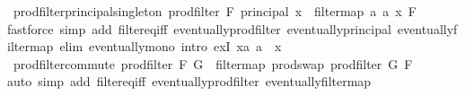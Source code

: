 \begin{isabellebody}
%
\isadelimproof
\isanewline
%
\endisadelimproof
\isanewline
{}\isamarkupfalse%
\ prod{\isacharunderscore}{\kern0pt}filter{\isacharunderscore}{\kern0pt}principal{\isacharunderscore}{\kern0pt}singleton{}{\isacharcolon}{\kern0pt}\ {\isachardoublequoteopen}prod{\isacharunderscore}{\kern0pt}filter\ F\ {\isacharparenleft}{\kern0pt}principal\ {\isacharbraceleft}{\kern0pt}x{\isacharbraceright}{\kern0pt}{\isacharparenright}{\kern0pt}\ {\isacharequal}{\kern0pt}\ filtermap\ {\isacharparenleft}{\kern0pt}{\isasymlambda}a{\isachardot}{\kern0pt}\ {\isacharparenleft}{\kern0pt}a{\isacharcomma}{\kern0pt}\ x{\isacharparenright}{\kern0pt}{\isacharparenright}{\kern0pt}\ F{\isachardoublequoteclose}\isanewline
%
\isadelimproof
\ \ %
\endisadelimproof
%
\isatagproof
{}\isamarkupfalse%
{\isacharparenleft}{\kern0pt}fastforce\ simp\ add{\isacharcolon}{\kern0pt}\ filter{\isacharunderscore}{\kern0pt}eq{\isacharunderscore}{\kern0pt}iff\ eventually{\isacharunderscore}{\kern0pt}prod{\isacharunderscore}{\kern0pt}filter\ eventually{\isacharunderscore}{\kern0pt}principal\ eventually{\isacharunderscore}{\kern0pt}filtermap\ elim{\isacharcolon}{\kern0pt}\ eventually{\isacharunderscore}{\kern0pt}mono\ intro{\isacharcolon}{\kern0pt}\ exI{\isacharbrackleft}{\kern0pt}\ x{\isacharequal}{\kern0pt}{\isachardoublequoteopen}{\isasymlambda}a{\isachardot}{\kern0pt}\ a\ {\isacharequal}{\kern0pt}\ x{\isachardoublequoteclose}{\isacharbrackright}{\kern0pt}{\isacharparenright}{\kern0pt}%
\endisatagproof
{\isafoldproof}%
%
\isadelimproof
\isanewline
%
\endisadelimproof
\isanewline
{}\isamarkupfalse%
\ prod{\isacharunderscore}{\kern0pt}filter{\isacharunderscore}{\kern0pt}commute{\isacharcolon}{\kern0pt}\ {\isachardoublequoteopen}prod{\isacharunderscore}{\kern0pt}filter\ F\ G\ {\isacharequal}{\kern0pt}\ filtermap\ prod{\isachardot}{\kern0pt}swap\ {\isacharparenleft}{\kern0pt}prod{\isacharunderscore}{\kern0pt}filter\ G\ F{\isacharparenright}{\kern0pt}{\isachardoublequoteclose}\isanewline
%
\isadelimproof
\ \ %
\endisadelimproof
%
\isatagproof
{}\isamarkupfalse%
{\isacharparenleft}{\kern0pt}auto\ simp\ add{\isacharcolon}{\kern0pt}\ filter{\isacharunderscore}{\kern0pt}eq{\isacharunderscore}{\kern0pt}iff\ eventually{\isacharunderscore}{\kern0pt}prod{\isacharunderscore}{\kern0pt}filter\ eventually{\isacharunderscore}{\kern0pt}filtermap{\isacharparenright}{\kern0pt}%
\endisatagproof
{\isafoldproof}%
%
\isadelimproof
%
\endisadelimproof
%
\isadelimdocument
%
\endisadelimdocument
%
\isatagdocument
%

\end{isabellebody}
